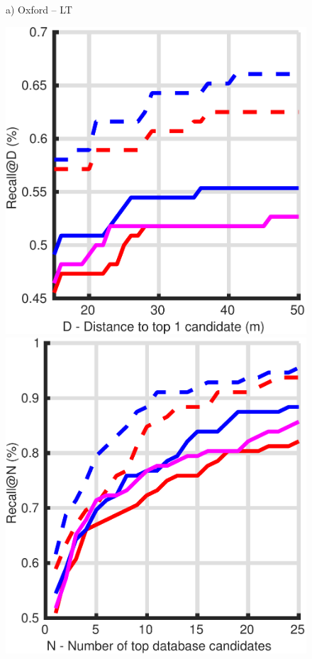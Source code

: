 \begin{figure}
\begin{minipage}{0.27\linewidth}
		a) Oxford -- LT
	\end{minipage}\hfill
	\begin{minipage}{0.27\linewidth}
		\center \scriptsize
		\includegraphics[width=\linewidth]{plot/oxf_cmu/Results_snow_queries/distance}	
		
		\includegraphics[width=\linewidth]{plot/oxf_cmu/Results_snow_queries/recall}
				

\end{minipage}
\end{figure}
